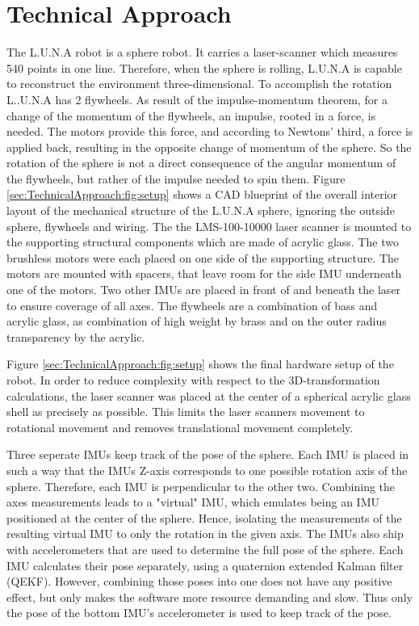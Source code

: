 \section*{Technical Approach}
\label{sec:TechnicalApproach}

The L.U.N.A robot is a sphere robot. It carries a  laser-scanner which measures 540 points in one line. Therefore, when the sphere is rolling, L.U.N.A is capable to reconstruct the environment three-dimensional. To accomplish the rotation L..U.N.A has 2 flywheels.
As result of the impulse-momentum theorem, for a change of the momentum of the flywheels, an impulse, rooted in a force, is needed. 
The motors provide this force, and according to Newtons' third, a force is applied back, resulting in the opposite change of momentum of the sphere. 
So the rotation of the sphere is not a direct consequence of the angular momentum of the flywheels, but rather of the impulse needed to spin them. 
Figure \ref{sec:TechnicalApproach:fig:setup} shows a CAD blueprint of the overall interior layout of the mechanical structure of the L.U.N.A sphere, ignoring the outside sphere, flywheels and wiring.
The the LMS-100-10000 laser scanner is mounted to the supporting structural components which are made of acrylic glass.
The two brushless motors were each placed on one side of the supporting structure. 
The motors are mounted with spacers, that leave room for the side IMU underneath one of the motors. 
Two other IMUs are placed in front of and beneath the laser to ensure coverage of all axes. 
The flywheels are a combination of bass and acrylic glass, as combination of high weight by brass and on the outer radius transparency by the acrylic.

Figure \ref{sec:TechnicalApproach:fig:setup} shows the final hardware setup of the robot.
In order to reduce complexity with respect to the 3D-transformation calculations, the laser scanner was placed at the center of a spherical acrylic glass shell as precisely as possible.
This limits the laser scanners movement to rotational movement and removes translational movement completely. 
                                   

Three seperate IMUs keep track of the pose of the sphere. Each IMU is placed in such a way that the IMUs Z-axis corresponds to one possible rotation axis of the sphere.
Therefore, each IMU is perpendicular to the other two.
Combining the axes measurements leads to a "virtual" IMU, which emulates being an IMU positioned at the center of the sphere. 
Hence, isolating the measurements of the resulting virtual IMU to only the rotation in the given axis.
The IMUs also ship with accelerometers that are used to determine the full pose of the sphere.
Each IMU calculates their pose separately, using a quaternion extended Kalman filter (QEKF).
However, combining those poses into one does not have any positive effect, but only makes the software more resource demanding and slow.
Thus only the pose of the bottom IMU's accelerometer is used to keep track of the pose.

